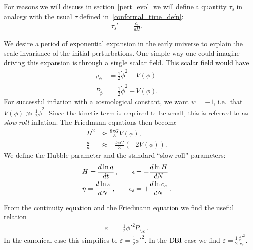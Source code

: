     For reasons we will discuss in section~\ref{pert_evol} we will
    define a quantity $\tau_s$
    in analogy with the usual $\tau$ defined in~\eqref{conformal_time_defn}:
    \begin{align}\label{tausdef}
        \tau_s'&=\frac{c_s}{aH}.
    \end{align}


    We desire a period of exponential expansion in the early universe to explain the
    scale-invariance of the initial perturbations.
    One simple way one could imagine driving this expansion is through a single
    scalar field. This scalar field would have
    \begin{align}
        \rho_\phi &= \frac{1}{2}\dot{\phi}^2+V(\phi)\\
        P_\phi &= \frac{1}{2}\dot{\phi}^2-V(\phi).
    \end{align}
    For successful inflation with a cosmological constant, we want $w=-1$,
    i.e.\ that $V(\phi)\gg\frac{1}{2}\dot{\phi}^2$. Since the kinetic term is required to
    be small, this is referred to as \textit{slow-roll} inflation.
    The Friedmann equations then become
    \begin{align}
        H^2 &\approx \frac{8\pi G}{3}V(\phi),\\
        \frac{\ddot{a}}{a} &\approx -\frac{4\pi G}{3}\left(-2V(\phi)\right).
    \end{align}
We define the Hubble parameter and the standard ``slow-roll'' parameters:
\begin{equation}
\label{slowrollparams}
\begin{split}
    H = \frac{d\ln a}{dt}	\,,
    \qquad
    \epsilon &= -\frac{d\ln H}{dN}	\\
    \eta = \frac{d\ln \varepsilon}{dN}	\,,
    \qquad
    \epsilon_s &= +\frac{d\ln c_s}{dN}	\,.
\end{split}
\end{equation}

From the continuity equation and the Friedmann equation
we find the useful relation
\begin{align}
    \varepsilon &= \frac{1}{2}{\phi'}^2 P,_{X}.
\end{align}
In the canonical case this simplifies to
$\varepsilon = \frac{1}{2}{\phi'}^2$.
In the $\text{DBI}$ case we find
$\varepsilon = \frac{1}{2}\frac{{\phi'}^2}{c_s}$.

